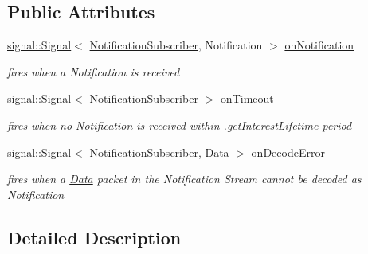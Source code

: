 \subsection*{Public Attributes}
\begin{DoxyCompactItemize}
\item 
\hyperlink{classndn_1_1util_1_1signal_1_1Signal}{signal\+::\+Signal}$<$ \hyperlink{classndn_1_1util_1_1NotificationSubscriber}{Notification\+Subscriber}, Notification $>$ \hyperlink{classndn_1_1util_1_1NotificationSubscriber_aeb09277ce44cf0308578a8de40af37c4}{on\+Notification}
\begin{DoxyCompactList}\small\item\em fires when a Notification is received \end{DoxyCompactList}\item 
\hyperlink{classndn_1_1util_1_1signal_1_1Signal}{signal\+::\+Signal}$<$ \hyperlink{classndn_1_1util_1_1NotificationSubscriber}{Notification\+Subscriber} $>$ \hyperlink{classndn_1_1util_1_1NotificationSubscriber_a9bbfb204fc59a8038bbd8c67c40c435e}{on\+Timeout}\hypertarget{classndn_1_1util_1_1NotificationSubscriber_a9bbfb204fc59a8038bbd8c67c40c435e}{}\label{classndn_1_1util_1_1NotificationSubscriber_a9bbfb204fc59a8038bbd8c67c40c435e}

\begin{DoxyCompactList}\small\item\em fires when no Notification is received within .get\+Interest\+Lifetime period \end{DoxyCompactList}\item 
\hyperlink{classndn_1_1util_1_1signal_1_1Signal}{signal\+::\+Signal}$<$ \hyperlink{classndn_1_1util_1_1NotificationSubscriber}{Notification\+Subscriber}, \hyperlink{classndn_1_1Data}{Data} $>$ \hyperlink{classndn_1_1util_1_1NotificationSubscriber_a122e88e4f2247f4d230c4a5bdd043625}{on\+Decode\+Error}\hypertarget{classndn_1_1util_1_1NotificationSubscriber_a122e88e4f2247f4d230c4a5bdd043625}{}\label{classndn_1_1util_1_1NotificationSubscriber_a122e88e4f2247f4d230c4a5bdd043625}

\begin{DoxyCompactList}\small\item\em fires when a \hyperlink{classndn_1_1Data}{Data} packet in the Notification Stream cannot be decoded as Notification \end{DoxyCompactList}\end{DoxyCompactItemize}


\subsection{Detailed Description}

